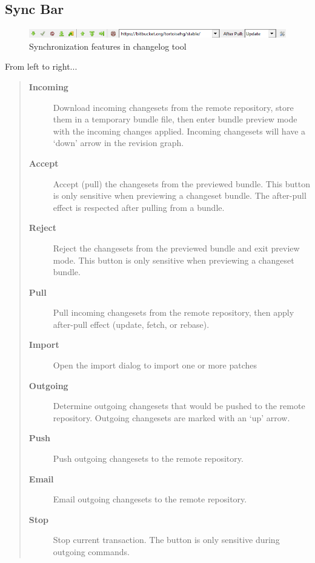 \documentclass[letterpaper,10pt,english]{manual}
\begin{document}
\subsection{Sync Bar}
\begin{figure}[htbp]
\centering

\includegraphics{syncbar.png}
\caption{Synchronization features in changelog tool}\end{figure}

From left to right...
\begin{quote}
\begin{description}
\item[\textbf{Incoming}]
Download incoming changesets from the remote repository, store
them in a temporary bundle file, then enter bundle preview mode
with the incoming changes applied.  Incoming changesets will
have a `down' arrow in the revision graph.

\item[\textbf{Accept}]
Accept (pull) the changesets from the previewed bundle.  This
button is only sensitive when previewing a changeset bundle.
The after-pull effect is respected after pulling from a bundle.

\item[\textbf{Reject}]
Reject the changesets from the previewed bundle and exit preview
mode.  This button is only sensitive when previewing a changeset
bundle.

\item[\textbf{Pull}]
Pull incoming changesets from the remote repository, then apply
after-pull effect (update, fetch, or rebase).

\item[\textbf{Import}]
Open the import dialog to import one or more patches

\item[\textbf{Outgoing}]
Determine outgoing changesets that would be pushed to the
remote repository.  Outgoing changesets are marked with an `up'
arrow.

\item[\textbf{Push}]
Push outgoing changesets to the remote repository.

\item[\textbf{Email}]
Email outgoing changesets to the remote repository.

\item[\textbf{Stop}]
Stop current transaction.  The button is only sensitive during
outgoing commands.

\end{description}
\end{quote}
\end{document}
